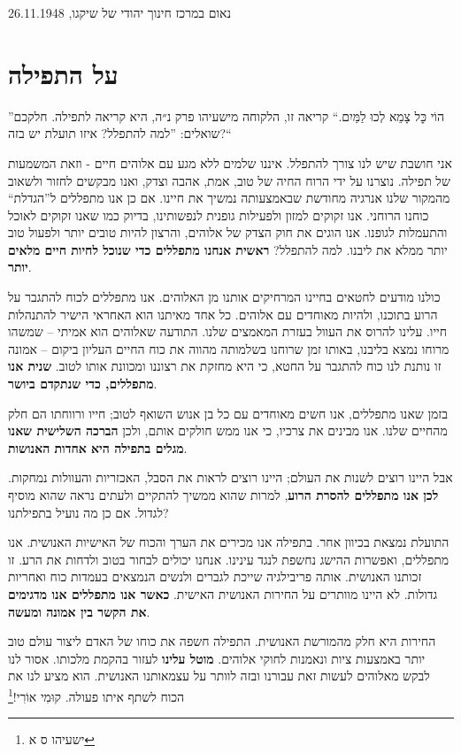 \documentclass[14pt, article, extrafontsizes, twopage, a4paper]{memoir}
\newcommand{\attr}[1]{
  {\raggedright\smaller#1


  }
}
\begin{document}
\attr{נאום במרכז חינוך יהודי של שיקגו, 26.11.1948}

\clearpage
\chapter{על התפילה}

”הוֹי כׇּל צָמֵא לְכוּ לַמַּיִם.“
קריאה זו, הלקוחה מישעיהו פרק נ״ה, היא קריאה לתפילה. חלקכם שואלים: ”למה להתפלל? איזו תועלת יש בזה?“

אני חושבת שיש לנו צורך להתפלל. איננו שלמים ללא מגע עם אלוהים חיים - וזאת המשמעות של תפילה. נוצרנו על ידי הרוח החיה של טוב, אמת, אהבה וצדק, ואנו מבקשים לחזור ולשאוב מהמקור שלנו אנרגיה מחודשת שבאמצעותה נמשיך את חיינו. אם כן אנו מתפללים ל”הגדלת“ כוחנו הרוחני. אנו זקוקים למזון ולפעילות גופנית לנפשותינו, בדיוק כמו שאנו זקוקים לאוכל והתעמלות לגופנו. אנו הוגים את חוק הצדק של אלוהים, והרצון להיות טובים יותר ולפעול טוב יותר ממלא את ליבנו. למה להתפלל? \textbf{ראשית אנחנו מתפללים כדי שנוכל לחיות חיים מלאים יותר}.

כולנו מודעים לחטאים בחיינו המרחיקים אותנו מן האלוהים. אנו מתפללים לכוח להתגבר על הרוע בתוכנו, ולהיות מאוחדים עם אלוהים. כל אחד מאיתנו הוא האחראי הישיר להתנהלות חייו. עלינו להרוס את העוול בעזרת המאמצים שלנו. התודעה שאלוהים הוא אמיתי -- שמשהו מרוחו נמצא בליבנו, באותו זמן שרוחנו בשלמותה מהווה את כוח החיים העליון ביקום – אמונה זו נותנת לנו כוח להתגבר על החטא, כי היא מחזקת את רצוננו ומכוונת אותו לטוב. \textbf{שנית אנו מתפללים, כדי שנתקדם ביושר}.

בזמן שאנו מתפללים, אנו חשים מאוחדים עם כל בן אנוש השואף לטוב; חייו ורווחתו הם חלק מהחיים שלנו. אנו מבינים את צרכיו, כי אנו ממש חולקים אותם, ולכן \textbf{הברכה השלישית שאנו מגלים בתפילה היא אחדות האנושות}.

אבל היינו רוצים לשנות את העולם; היינו רוצים לראות את הסבל, האכזריות והעוולות נמחקות. \textbf{לכן אנו מתפללים להסרת הרוע}, למרות שהוא ממשיך להתקיים ולעתים נראה שהוא מוסיף לגדול. אם כן מה נועיל בתפילתנו?

התועלת נמצאת בכיוון אחר. בתפילה אנו מכירים את הערך והכוח של האישיות האנושית. אנו מתפללים, ואפשרות ההישג נחשפת לנגד עינינו. אנחנו יכולים לבחור בטוב ולדחות את הרע. זו זכותנו האנושית. אותה פריבילגיה שייכת לגברים ולנשים הנמצאים בעמדות כוח ואחריות גדולות. לא היינו מוותרים על החירות האנושית האישית. \textbf{כאשר אנו מתפללים אנו מדגימים את הקשר בין אמונה ומעשה}.

החירות היא חלק מהמורשת האנושית. התפילה חשפה את כוחו של האדם ליצור עולם טוב יותר באמצעות ציות ונאמנות לחוקי אלוהים. \textbf{מוטל עלינו} לעזור בהקמת מלכותו. אסור לנו לבקש מאלוהים לעשות זאת עבורנו ובזה לוותר על עצמאותנו האנושית. הוא מציע לנו את הכוח לשתף איתו פעולה. קוּמִי אוֹרִי!\footnote{ישעיהו ס א}
\end{document}
